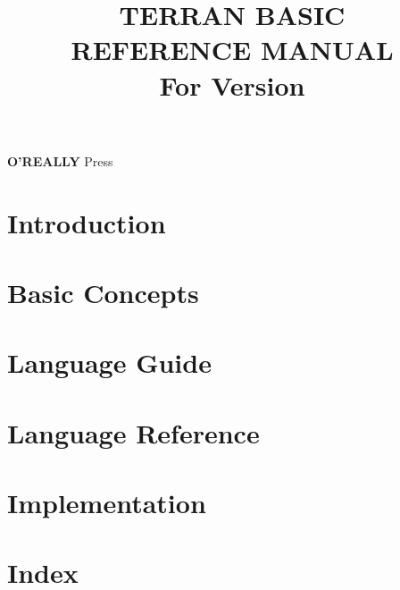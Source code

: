 \documentclass[10pt, stock, openany]{memoir}
\title{\HUGE\textbf{TERRAN BASIC \\ REFERENCE MANUAL} \\ \Large \vspace{1em} For Version \tbasver \\ \vspace{7mm} \theedition}
\date{}
\author{}
\newcommand{\oreallypress}{\large\textbf{O'REALLY\raisebox{1ex}{\scriptsize ?}} \normalsize Press}
\begin{document}
\begin{titlingpage}
\maketitle{}
\vfill
\oreallypress
\end{titlingpage}

\setcounter{page}{3}

\tableofcontents*



\openright
\chapter{Introduction}


\openany
\chapter{Basic Concepts}


\chapter{Language Guide}


\chapter{Language Reference}


\chapter{Implementation}





\chapter{Index}




\afterpage{\pagestyle{empty}\null\newpage}
\end{document}
